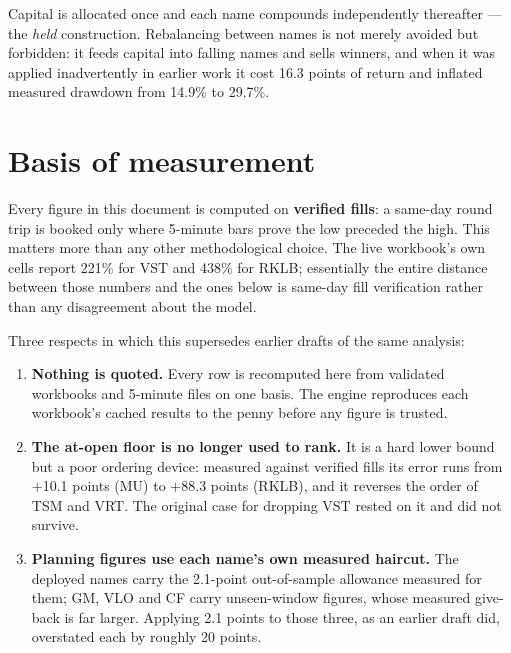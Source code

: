 \documentclass[11pt]{article}
\begin{document}
Capital is allocated once and each name compounds independently thereafter --- the \emph{held}
construction. Rebalancing between names is not merely avoided but forbidden: it feeds capital
into falling names and sells winners, and when it was applied inadvertently in earlier work it
cost 16.3 points of return and inflated measured drawdown from 14.9\% to 29.7\%.

\section{Basis of measurement}

Every figure in this document is computed on \textbf{verified fills}: a same-day round trip is
booked only where 5-minute bars prove the low preceded the high. This matters more than any
other methodological choice. The live workbook's own cells report 221\% for VST and 438\% for
RKLB; essentially the entire distance between those numbers and the ones below is same-day fill
verification rather than any disagreement about the model.

Three respects in which this supersedes earlier drafts of the same analysis:

\begin{enumerate}[leftmargin=1.5em,itemsep=4pt,topsep=4pt]
  \item \textbf{Nothing is quoted.} Every row is recomputed here from validated workbooks and
        5-minute files on one basis. The engine reproduces each workbook's cached results to the
        penny before any figure is trusted.
  \item \textbf{The at-open floor is no longer used to rank.} It is a hard lower bound but a
        poor ordering device: measured against verified fills its error runs from $+$10.1 points
        (MU) to $+$88.3 points (RKLB), and it reverses the order of TSM and VRT. The original
        case for dropping VST rested on it and did not survive.
  \item \textbf{Planning figures use each name's own measured haircut.} The deployed names carry
        the 2.1-point out-of-sample allowance measured for them; GM, VLO and CF carry
        unseen-window figures, whose measured give-back is far larger. Applying 2.1 points to
        those three, as an earlier draft did, overstated each by roughly 20 points.
\end{enumerate}

\end{document}
